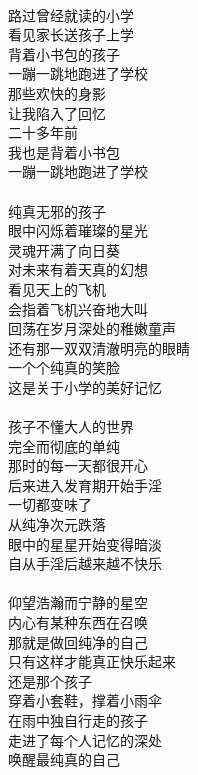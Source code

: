 \begin{poem}[唤醒最纯真的自己]
    \begin{multicols}{3}
        \centering~\\
        路过曾经就读的小学 \\ 看见家长送孩子上学 \\ 背着小书包的孩子 \\ 一蹦一跳地跑进了学校 \\ 那些欢快的身影 \\ 让我陷入了回忆 \\ 二十多年前 \\ 我也是背着小书包 \\ 一蹦一跳地跑进了学校 \\~\\
        纯真无邪的孩子 \\ 眼中闪烁着璀璨的星光 \\ 灵魂开满了向日葵 \\ 对未来有着天真的幻想 \\ 看见天上的飞机 \\ 会指着飞机兴奋地大叫 \\ 回荡在岁月深处的稚嫩童声 \\ 还有那一双双清澈明亮的眼睛 \\ 一个个纯真的笑脸 \\ 这是关于小学的美好记忆 \\~\\
        孩子不懂大人的世界 \\ 完全而彻底的单纯 \\ 那时的每一天都很开心 \\ 后来进入发育期开始手淫 \\ 一切都变味了 \\ 从纯净次元跌落 \\ 眼中的星星开始变得暗淡 \\ 自从手淫后越来越不快乐 \\~\\
        仰望浩瀚而宁静的星空 \\ 内心有某种东西在召唤 \\ 那就是做回纯净的自己 \\ 只有这样才能真正快乐起来 \\ 还是那个孩子 \\ 穿着小套鞋，撑着小雨伞 \\ 在雨中独自行走的孩子 \\ 走进了每个人记忆的深处 \\ 唤醒最纯真的自己
    \end{multicols}
\end{poem}

